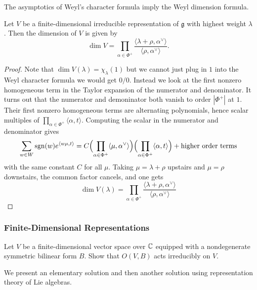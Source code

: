 \documentclass[12pt]{article}
\begin{document}
The asymptotics of Weyl's character formula imply the Weyl dimension formula.

\begin{theorem}
     Let $V$ be a finite-dimensional irreducible representation of $\mathfrak{g}$ with highest weight $\lambda$. Then the dimension of $V$ is given by
    \[
        \dim V = \prod_{\alpha \in \Phi^+} \frac{\langle \lambda + \rho,\alpha^\vee\rangle}{ \langle \rho, \alpha^\vee\rangle}.
    \]
\end{theorem}

\begin{proof}
    Note that $\dim V(\lambda)=\chi_\lambda(1)$ but we cannot just plug in $1$ into the Weyl character formula we would get $0/0$. Instead we look at the first nonzero homogeneous term in the Taylor expansion of the numerator and denominator. It turns out that the numerator and demoninator both vanish to order $|\Phi^+|$ at $1$. Their first nonzero homogeneous terms are alternating polynomials, hence scalar multiples of
    $\prod_{\alpha\in\Phi^+}\langle \alpha,t\rangle$.
    Computing the scalar in the numerator and denominator gives
    \[\sum_{w\in W}\operatorname{sgn}(w)e^{\langle w\mu,t\rangle}
        =
        C\Bigl(\prod_{\alpha\in\Phi^+}\langle \mu,\alpha^\vee\rangle\Bigr)
        \Bigl(\prod_{\alpha\in\Phi^+}\langle \alpha,t\rangle\Bigr)
        +\text{higher order terms}\]
    with the same constant $C$ for all $\mu$. Taking $\mu=\lambda+\rho$ upstairs and $\mu=\rho$ downstairs, the common factor cancels, and one gets
    \[\dim V(\lambda)
        =
        \prod_{\alpha\in \Phi^+}
        \frac{\langle \lambda+\rho,\alpha^\vee\rangle}{\langle \rho,\alpha^\vee\rangle}\]
\end{proof}

\subsubsection{Finite-Dimensional Representations}

\begin{exercise}
    Let $V$ be a finite-dimensional vector space over $\mathbb{C}$ equipped with a nondegenerate symmetric bilinear form $B$. Show that $O(V,B)$ acts irreducibly on $V$.
\end{exercise}
We present an elementary solution and then another solution using representation theory of Lie algebras.
\end{document}
